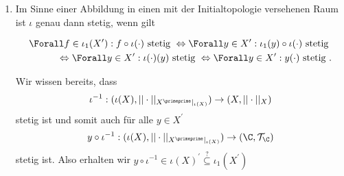 \begin{solution}
\begin{enumerate}[label = (\arabic*)]
  ***************

  \item

  Im Sinne einer Abbildung in einen mit der Initialtopologie versehenen Raum ist $\iota$ genau dann stetig, wenn gilt

  \begin{align*}
    \Forall f \in \iota_1(X^{\prime}): f \circ \iota(\cdot) \text{~stetig~} \Leftrightarrow \Forall y \in X^{\prime}: \iota_1 (y) \circ \iota(\cdot) \text{~stetig~} \\
     \Leftrightarrow \Forall y \in X^{\prime}: \iota(\cdot)(y) \text{~stetig~} \Leftrightarrow \Forall y \in X^{\prime}: y(\cdot) \text{~stetig~}.
  \end{align*}

  Wir wissen bereits, dass
  \begin{align*}
    \iota^{-1}: (\iota(X),||\cdot||_{X^{\primeprime}|_{\iota(X)}}) \rightarrow (X,||\cdot||_X)
  \end{align*}
  stetig ist und somit auch für alle $y \in X^{\prime}$
  \begin{align*}
    y \circ \iota^{-1}: (\iota(X),||\cdot||_{X^{\primeprime}|_{\iota(X)}}) \rightarrow (\C,\mathcal{T}_\C)
  \end{align*}
  stetig ist. Also erhalten wir $y \circ \iota^{-1} \in \iota(X)^{\prime} \stackrel{?}{\subseteq} \iota_1(X^{\prime})$

\end{enumerate}


\end{solution}
